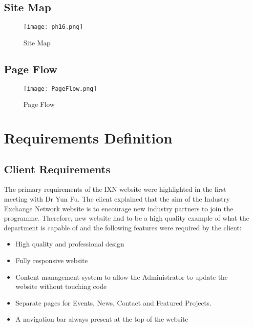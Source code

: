 \documentclass[fontsize=11pt]{extarticle}
\numberwithin{figure}{section} %
\providecommand{\tightlist}{%
  \setlength{\itemsep}{0pt}\setlength{\parskip}{0pt}}
\begin{document}
\hypertarget{site-map}{%
\subsection{Site Map}\label{site-map}}

\begin{figure}[H]
      \centering
      \texttt{[image: ph16.png]}
      \caption{Site Map}
      \label{sitemap}
 \end{figure}

\hypertarget{page-flow}{%
\subsection{Page Flow}\label{page-flow}}

\begin{figure}[H]
      \centering
      \texttt{[image: PageFlow.png]}
      \caption{Page Flow}
      \label{pageflow}
 \end{figure}

\newpage

\hypertarget{requirements-definition}{%
\section{Requirements Definition}\label{requirements-definition}}

\hypertarget{client-requirements}{%
\subsection{Client Requirements}\label{client-requirements}}

The primary requirements of the IXN website were highlighted in the
first meeting with Dr Yun Fu. The client explained that the aim of the
Industry Exchange Network website is to encourage new industry partners
to join the programme. Therefore, new website had to be a high quality
example of what the department is capable of and the following features
were required by the client:

\begin{itemize}
\tightlist
\item
  High quality and professional design
\item
  Fully responsive website
\item
  Content management system to allow the Administrator to update the
  website without touching code
\item
  Separate pages for Events, News, Contact and Featured Projects.
\item
  A navigation bar always present at the top of the website
\end{itemize}
\end{document}
